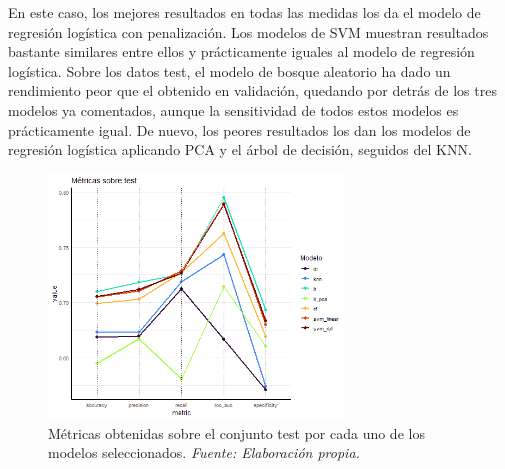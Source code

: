 \documentclass[12pt,a4paper,]{book}
\numberwithin{dummy}{section}
\theoremstyle{ocrenumbox}
\theoremstyle{blacknumex}
\theoremstyle{blacknumbox}
\theoremstyle{ocrenum}
\theoremstyle{ocrenum}
\begin{document}
En este caso, los mejores resultados en todas las medidas los da el
modelo de regresión logística con penalización. Los modelos de SVM
muestran resultados bastante similares entre ellos y prácticamente
iguales al modelo de regresión logística. Sobre los datos test, el
modelo de bosque aleatorio ha dado un rendimiento peor que el obtenido
en validación, quedando por detrás de los tres modelos ya comentados,
aunque la sensitividad de todos estos modelos es prácticamente igual. De
nuevo, los peores resultados los dan los modelos de regresión logística
aplicando PCA y el árbol de decisión, seguidos del KNN.

\begin{table}[]
\centering
{}
\caption{Métricas sobre el conjunto test. \it Fuente: Elaboración propia.}
\label{tab:metricas_test}
\end{table}

\begin{figure}[h]
\centering
\includegraphics[width =0.7\textwidth]{graficos/test_metrics.png}
\caption{Métricas obtenidas sobre el conjunto test por cada uno de los modelos seleccionados. \it Fuente: Elaboración propia.}
\label{fig:test_metrics}
\end{figure}
\end{document}
